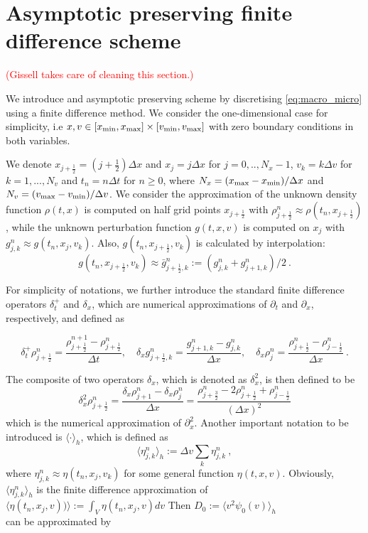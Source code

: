 \documentclass[11pt,twoside]{article}
\numberwithin{equation}{section}
\begin{document}
\section{Asymptotic preserving finite difference scheme}
\textcolor{red}{(Gissell takes care of cleaning this section.)}

We introduce and asymptotic preserving scheme by discretising \eqref{eq:macro_micro} using a finite difference method. 
We consider the  one-dimensional case for simplicity, i.e $x,v\in[x_{\textnormal{min}},x_{\textnormal{max}}]\times[v_{\textnormal{min}},v_{\textnormal{max}}]$ with zero boundary conditions in both variables.

We denote  $x_{j+\frac{1}{2}}=(j+\frac{1}{2})\Delta x$ and $x_{j}=j\Delta x$ for $j=0,..,N_x-1$,  $v_k=k\Delta v$ for $ k=1,...,N_v$ and $t_n=n\Delta t$ for $n\geq 0$, where $ N_x=(x_{\textnormal{max}}-x_{\textnormal{min}})/\Delta x$ and $N_v=(v_{\textnormal{max}}-v_{\textnormal{min}})/\Delta v$. We consider the approximation of the unknown density function  $\rho(t,x)$ is computed on half grid points $x_{j+\frac{1}{2}}$ with $\rho_{j+\frac{1}{2}}^n\approx\rho(t_n,x_{j+\frac{1}{2}})$, while the unknown perturbation function $g(t,x,v)$ is computed on  $x_{j}$ with $g_{j,k}^n\approx g(t_n,x_{j},v_k)$. Also,   $g(t_n,x_{j+\frac{1}{2}},v_k)$ is calculated by interpolation:
$$g(t_n,x_{j+\frac{1}{2}},v_k)\approx \bar{g}_{j+\frac{1}{2},k}^n:=(g_{j,k}^n+g_{j+1,k}^n)/2\ .$$

For simplicity of notations, we further introduce the standard finite difference operators $\delta_t^+$ and $\delta_x$, which are numerical approximations of $\partial_t$ and $\partial_x$, respectively, and defined as 

$$\delta_t^+\rho_{j+\frac{1}{2}}^n=\frac{\rho_{j+\frac{1}{2}}^{n+1}-\rho_{j+\frac{1}{2}}^n}{\Delta t}, \quad\delta_xg_{j+\frac{1}{2},k}^n=\frac{g_{j+1,k}^n-g_{j,k}^n}{\Delta x},\quad \delta_x\rho_{j}^n=\frac{\rho_{j+\frac{1}{2}}^n-\rho_{j-\frac{1}{2}}^n}{\Delta x}\ .$$

The composite of two operators $\delta_x$, which is denoted as $\delta_x^2$, is then defined to be 
$$
\delta_x^2\rho_{j+\frac{1}{2}}^n=\frac{\delta_ x\rho_{j+1}^n-\delta_x\rho_{j}^n}{\Delta x}=\frac{\rho_{j+\frac{3}{2}}^n-2\rho_{j+\frac{1}{2}}^n+\rho_{j-\frac{1}{2}}^n}{(\Delta x)^2}
$$
which is the numerical approximation of $\partial_x^2$. Another important notation to be introduced is $\langle \cdot \rangle_h$, which is defined as
$$
\langle \eta_{j,k}^n \rangle_h:=\Delta v\sum_k\eta_{j,k}^n\ ,
$$
where $\eta_{j,k}^n\approx \eta(t_n,x_j,v_k)$ for some general function $\eta(t,x,v)$. Obviously, $\langle \eta_{j,k}^n \rangle_h$ is the finite difference approximation of $\langle \eta(t_n,x_j,v))\rangle:=\int_V \eta(t_n,x_j,v) dv$
Then $D_0:=\langle v^2\psi_0(v) \rangle_h$\\
can be approximated by
\end{document}
